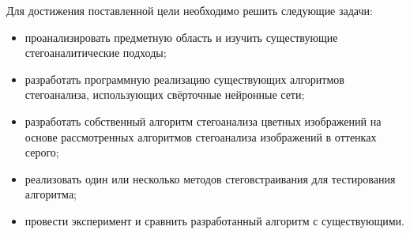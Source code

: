Для достижения поставленной цели необходимо решить следующие задачи:
\begin{itemize}
\item проанализировать предметную область и изучить существующие стегоаналитические подходы;
\item разработать программную реализацию существующих алгоритмов стегоанализа, использующих свёрточные нейронные сети;
\item разработать собственный алгоритм стегоанализа цветных изображений на основе рассмотренных алгоритмов стегоанализа изображений в оттенках серого;
\item реализовать один или несколько методов стеговстраивания для тестирования алгоритма;
\item провести эксперимент и сравнить разработанный алгоритм с существующими.
\end{itemize}

\clearpage
